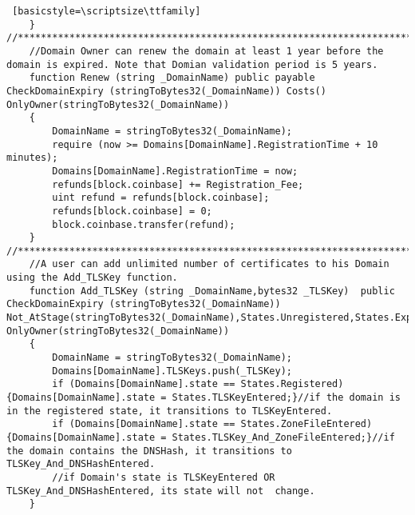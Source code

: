 \begin{lstlisting} [basicstyle=\scriptsize\ttfamily]
    }
//************************************************************************************************************************//
    //Domain Owner can renew the domain at least 1 year before the domain is expired. Note that Domian validation period is 5 years.
    function Renew (string _DomainName) public payable CheckDomainExpiry (stringToBytes32(_DomainName)) Costs() OnlyOwner(stringToBytes32(_DomainName))
    {
        DomainName = stringToBytes32(_DomainName);
        require (now >= Domains[DomainName].RegistrationTime + 10 minutes);
        Domains[DomainName].RegistrationTime = now;
        refunds[block.coinbase] += Registration_Fee;
        uint refund = refunds[block.coinbase];
        refunds[block.coinbase] = 0;
        block.coinbase.transfer(refund);
    }
//************************************************************************************************************************//
    //A user can add unlimited number of certificates to his Domain using the Add_TLSKey function.
    function Add_TLSKey (string _DomainName,bytes32 _TLSKey)  public CheckDomainExpiry (stringToBytes32(_DomainName)) Not_AtStage(stringToBytes32(_DomainName),States.Unregistered,States.Expired) OnlyOwner(stringToBytes32(_DomainName))
    {
        DomainName = stringToBytes32(_DomainName);
        Domains[DomainName].TLSKeys.push(_TLSKey);
        if (Domains[DomainName].state == States.Registered) {Domains[DomainName].state = States.TLSKeyEntered;}//if the domain is in the registered state, it transitions to TLSKeyEntered.
        if (Domains[DomainName].state == States.ZoneFileEntered) {Domains[DomainName].state = States.TLSKey_And_ZoneFileEntered;}//if the domain contains the DNSHash, it transitions to TLSKey_And_DNSHashEntered.
        //if Domain's state is TLSKeyEntered OR TLSKey_And_DNSHashEntered, its state will not  change.
    }


\end{lstlisting}
